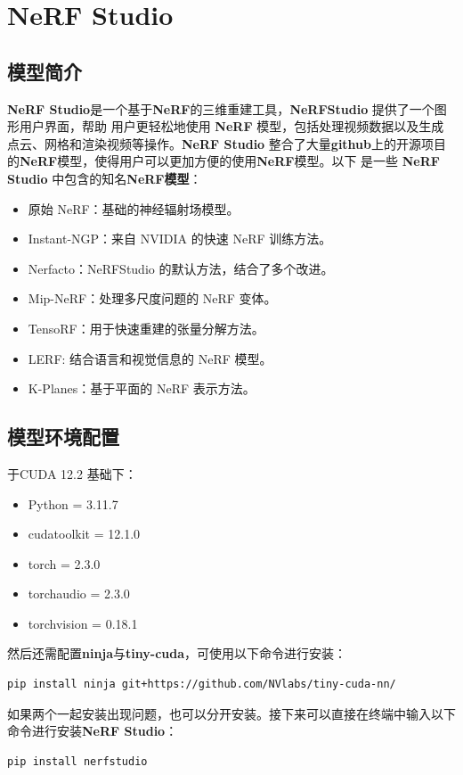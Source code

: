 \documentclass{nwputhesis}
\begin{document}
\section{NeRF Studio}
\subsection{模型简介}
\textbf{NeRF Studio}是一个基于\textbf{NeRF}的三维重建工具，\textbf{NeRFStudio} 提供了一个图形用户界面，帮助
用户更轻松地使用 \textbf{NeRF} 模型，包括处理视频数据以及生成点云、网格和渲染视频等操作。\textbf{NeRF Studio}
整合了大量\textbf{github}上的开源项目的\textbf{NeRF}模型，使得用户可以更加方便的使用\textbf{NeRF}模型。以下
是一些 \textbf{NeRF Studio} 中包含的知名\textbf{NeRF模型}：
\begin{itemize}
    \item 原始 NeRF：基础的神经辐射场模型。
    \item Instant-NGP：来自 NVIDIA 的快速 NeRF 训练方法。
    \item Nerfacto：NeRFStudio 的默认方法，结合了多个改进。
    \item Mip-NeRF：处理多尺度问题的 NeRF 变体。
    \item TensoRF：用于快速重建的张量分解方法。
    \item LERF: 结合语言和视觉信息的 NeRF 模型。
    \item K-Planes：基于平面的 NeRF 表示方法。
\end{itemize}
\subsection{模型环境配置}
\noindent 于CUDA 12.2 基础下：
\begin{itemize}
    \item Python = 3.11.7
    \item cudatoolkit = 12.1.0
    \item torch = 2.3.0
    \item torchaudio = 2.3.0
    \item torchvision = 0.18.1
\end{itemize}
然后还需配置\textbf{ninja}与\textbf{tiny-cuda}，可使用以下命令进行安装：
\begin{lstlisting}[language=bash]
    pip install ninja git+https://github.com/NVlabs/tiny-cuda-nn/
\end{lstlisting}

\indent
如果两个一起安装出现问题，也可以分开安装。接下来可以直接在终端中输入以下命令进行安装\textbf{NeRF Studio}：
\begin{lstlisting}[language=bash]
    pip install nerfstudio
\end{lstlisting}
\end{document}
